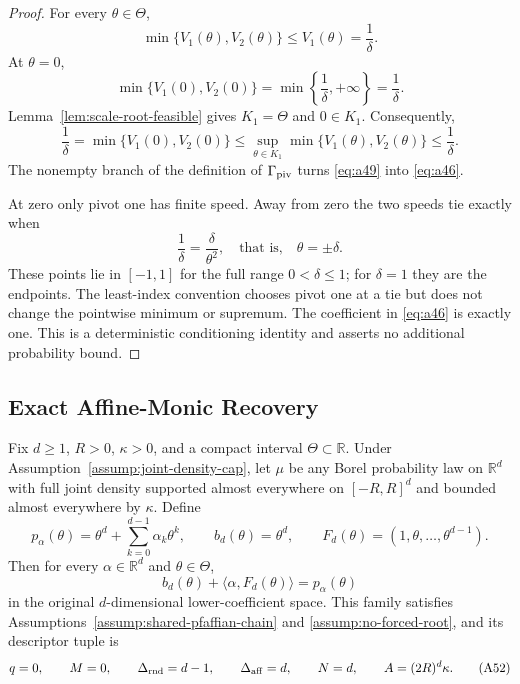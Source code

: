 \begin{proof}
For every $\theta\in\Theta$,
\[
\min\{V_1(\theta),V_2(\theta)\}
\leq V_1(\theta)=\frac1\delta.
\tag{A47}\label{eq:a47}
\]
At $\theta=0$,
\[
\min\{V_1(0),V_2(0)\}
=\min\left\{\frac1\delta,+\infty\right\}
=\frac1\delta.
\tag{A48}\label{eq:a48}
\]
Lemma~\ref{lem:scale-root-feasible} gives $K_1=\Theta$ and $0\in K_1$.
Consequently,
\[
\frac1\delta
=\min\{V_1(0),V_2(0)\}
\leq\sup_{\theta\in K_1}\min\{V_1(\theta),V_2(\theta)\}
\leq\frac1\delta.
\tag{A49}\label{eq:a49}
\]
The nonempty branch of the definition of $\Gamma_{\rm piv}$ turns
\eqref{eq:a49} into \eqref{eq:a46}.

At zero only pivot one has finite speed.  Away from zero the two speeds tie
exactly when
\[
\frac1\delta=\frac\delta{\theta^2},
\quad\text{that is,}\quad\theta=\pm\delta.
\]
These points lie in $[-1,1]$ for the full range $0<\delta\leq1$; for
$\delta=1$ they are the endpoints.  The least-index convention chooses
pivot one at a tie but does not change the pointwise minimum or supremum.
The coefficient in \eqref{eq:a46} is exactly one.  This is a deterministic
conditioning identity and asserts no additional probability bound.
\end{proof}

\subsection{Exact Affine-Monic Recovery}

\begin{proposition}
\label{prop:monic-presentation}
Fix $d\geq1$, $R>0$, $\kappa>0$, and a compact interval
$\Theta\subset\mathbb R$.  Under Assumption~\ref{assump:joint-density-cap},
let $\mu$ be any Borel probability law on $\mathbb R^d$ with full joint
density supported almost everywhere on $[-R,R]^d$ and bounded almost
everywhere by $\kappa$.  Define
\[
p_\alpha(\theta)=\theta^d+\sum_{k=0}^{d-1}\alpha_k\theta^k,
\qquad
b_d(\theta)=\theta^d,
\qquad
F_d(\theta)=(1,\theta,\ldots,\theta^{d-1}).
\tag{A50}\label{eq:a50}
\]
Then for every $\alpha\in\mathbb R^d$ and $\theta\in\Theta$,
\[
b_d(\theta)+\langle\alpha,F_d(\theta)\rangle=p_\alpha(\theta)
\tag{A51}\label{eq:a51}
\]
in the original $d$-dimensional lower-coefficient space.  This family
satisfies Assumptions~\ref{assump:shared-pfaffian-chain} and
\ref{assump:no-forced-root}, and its descriptor tuple is
\[
q=0,
\qquad M=0,
\qquad\Delta_{\rm rnd}=d-1,
\qquad\Delta_{\rm aff}=d,
\qquad N=d,
\qquad A=(2R)^d\kappa.
\tag{A52}\label{eq:a52}
\]
\end{proposition}

